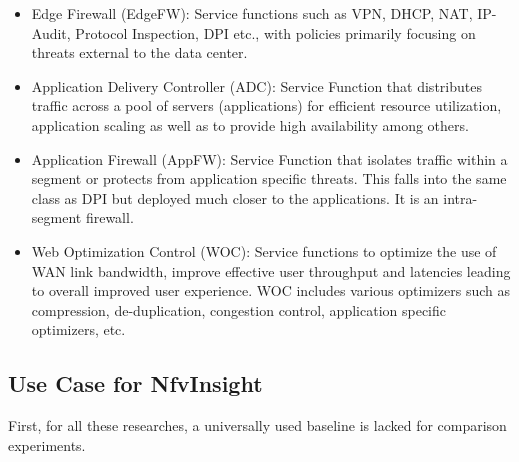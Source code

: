 \begin{itemize}
\item
Edge Firewall (EdgeFW): Service functions such as VPN, DHCP, NAT, IP-Audit, Protocol Inspection, DPI etc., with policies primarily focusing on threats external to the data center.

\item
Application Delivery Controller (ADC): Service Function that distributes traffic across a pool of servers (applications) for efficient resource utilization, application scaling as well as to provide high availability among others.

\item
Application Firewall (AppFW): Service Function that isolates traffic within a segment or protects from application specific threats. This falls into the same class as DPI but deployed much closer to the applications. It is an intra-segment firewall.

\item
Web Optimization Control (WOC): Service functions to optimize the use of WAN link bandwidth, improve effective user throughput and latencies leading to overall improved user experience. WOC includes various optimizers such as compression, de-duplication, congestion control, application specific optimizers, etc. %
\end{itemize}





\subsection{Use Case for NfvInsight}
First, for all these researches, a universally used baseline is lacked
for comparison experiments.

